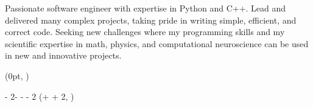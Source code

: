 \documentclass[10pt, a4paper]{resume}
\begin{document}
\makecvheader %

\begin{cvsummary}
Passionate software engineer with expertise in Python and C++. Lead and delivered many complex projects, taking pride in writing simple, efficient, and correct code. Seeking new challenges where my programming skills and my scientific expertise in math, physics, and computational neuroscience can be used in new and innovative projects.
\end{cvsummary}



\setlength{\headersmargin}{-0.2cm}
\setlength{\leftcolumnwidth}{4cm}
\setlength{\columnsmargin}{0.5\sidemargin}
\setlength{\timelinemargin}{0.5cm}


\begin{textblock*}{\leftcolumnwidth}(0pt, \headersmargin)
    \vspace{-2mm}
    
    \vspace{3mm}
    
    \vspace{3.5mm}
    
\end{textblock*}

\begin{textblock*}
    {\paperwidth - 2\sidemargin - \leftcolumnwidth - \columnsmargin - 2\timelinemargin}
    (\leftcolumnwidth + \columnsmargin + 2\timelinemargin, \headersmargin)
    \vspace{-2mm}
    
    
    
\end{textblock*}

\end{document}
